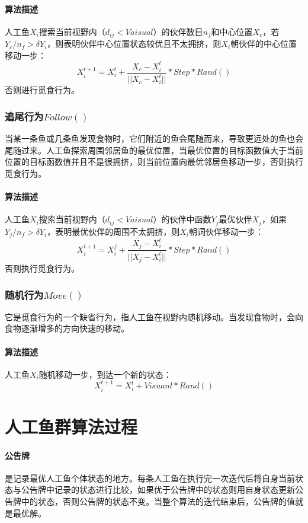 \documentclass[UTF8]{ctexart}
\begin{document}
				\paragraph{算法描述}人工鱼$X_i$搜索当前视野内（$d_{ij}<Vaisual$）的伙伴数目$n_f$和中心位置$X_c$，若$Y_c/n_f>\delta Y_i$，则表明伙伴中心位置状态较优且不太拥挤，则$X_i$朝伙伴的中心位置移动一步：
					$$X_i^{t+1}=X_i^t+\frac{X_c-X_i^t}{||X_c-X_i^t||}*Step*Rand()$$
				否则进行觅食行为。

			\subsubsection{追尾行为$Follow()$}
				当某一条鱼或几条鱼发现食物时，它们附近的鱼会尾随而来，导致更远处的鱼也会尾随过来。人工鱼探索周围邻居鱼的最优位置，当最优位置的目标函数值大于当前位置的目标函数值并且不是很拥挤，则当前位置向最优邻居鱼移动一步，否则执行觅食行为。
				\paragraph{算法描述}人工鱼$X_i$搜索当前视野内（$d_{ij}<Vaisual$）的伙伴中函数$Y_j$最优伙伴$X_j$，如果$Y_j/n_f>\delta Y_i$，表明最优伙伴的周围不太拥挤，则$X_i$朝词伙伴移动一步：
					$$X_i^{t+1}=X_i^j+\frac{X_j-X_i^t}{||X_j-X_i^t||}*Step*Rand()$$
				否则执行觅食行为。

			\subsubsection{随机行为$Move()$}
				它是觅食行为的一个缺省行为，指人工鱼在视野内随机移动。当发现食物时，会向食物逐渐增多的方向快速的移动。
				\paragraph{算法描述}人工鱼$X_i$随机移动一步，到达一个新的状态：
					$$X_i^{t+1}=X_i^t+Visuanl*Rand()$$

	\section{人工鱼群算法过程}
		\paragraph{公告牌}是记录最优人工鱼个体状态的地方。每条人工鱼在执行完一次迭代后将自身当前状态与公告牌中记录的状态进行比较，如果优于公告牌中的状态则用自身状态更新公告牌中的状态，否则公告牌的状态不变。当整个算法的迭代结束后，公告牌的值就是最优解。
\end{document}
